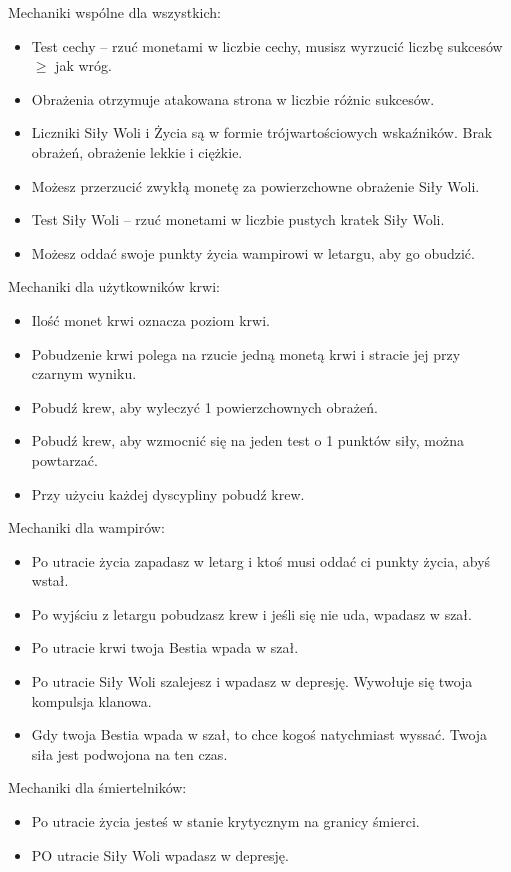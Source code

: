 	Mechaniki wspólne dla wszystkich:
	\begin{itemize}
		\item Test cechy -- rzuć monetami w liczbie cechy, musisz wyrzucić liczbę sukcesów $\geqslant$ jak wróg.
		\item Obrażenia otrzymuje atakowana strona w liczbie różnic sukcesów.
		\item Liczniki Siły Woli i Życia są w formie trójwartościowych wskaźników. Brak obrażeń, obrażenie lekkie i ciężkie.
		\item Możesz przerzucić zwykłą monetę za powierzchowne obrażenie Siły Woli.
		\item Test Siły Woli -- rzuć monetami w liczbie pustych kratek Siły Woli.
		\item Możesz oddać swoje punkty życia wampirowi w letargu, aby go obudzić.
	\end{itemize}

	Mechaniki dla użytkowników krwi:
	\begin{itemize}
		\item Ilość monet krwi oznacza poziom krwi.
		\item Pobudzenie krwi polega na rzucie jedną monetą krwi i stracie jej przy czarnym wyniku.
		\item Pobudź krew, aby wyleczyć 1 powierzchownych obrażeń.
		\item Pobudź krew, aby wzmocnić się na jeden test o 1 punktów siły, można powtarzać.
		\item Przy użyciu każdej dyscypliny pobudź krew.
	\end{itemize}

	Mechaniki dla wampirów:
	\begin{itemize}
		\item Po utracie życia zapadasz w letarg i ktoś musi oddać ci punkty życia, abyś wstał.
		\item Po wyjściu z letargu pobudzasz krew i jeśli się nie uda, wpadasz w szał.
		\item Po utracie krwi twoja Bestia wpada w szał.
		\item Po utracie Siły Woli szalejesz i wpadasz w depresję. Wywołuje się twoja kompulsja klanowa.
		\item Gdy twoja Bestia wpada w szał, to chce kogoś natychmiast wyssać. Twoja siła jest podwojona na ten czas.
	\end{itemize}

	Mechaniki dla śmiertelników:
	\begin{itemize}
		\item Po utracie życia jesteś w stanie krytycznym na granicy śmierci.
		\item PO utracie Siły Woli wpadasz w depresję.
	\end{itemize}

